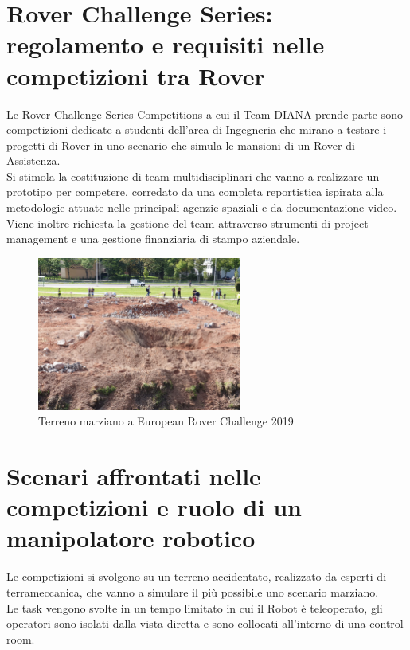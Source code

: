 \documentclass[%
corpo=11pt,
twoside,
 stile=classica,
oldstyle,
greek,%
]{toptesi}
\begin{document}
	\section{Rover Challenge Series: regolamento e requisiti nelle competizioni tra Rover}
	Le Rover Challenge Series Competitions a cui il Team DIANA prende parte sono competizioni dedicate a studenti dell'area di Ingegneria che mirano a testare i progetti di Rover in uno scenario che simula le mansioni di un Rover di Assistenza.\\
	Si stimola la costituzione di team multidisciplinari che vanno a realizzare un prototipo per competere, corredato da una completa reportistica ispirata alla metodologie attuate nelle principali agenzie spaziali e da documentazione video.\\
	 Viene inoltre richiesta la gestione del team attraverso strumenti di project management e una gestione finanziaria di stampo aziendale.
 
	\begin{figure}
		\centering
		\includegraphics[width=0.6\textwidth]{image/terrain.jpeg}
		\caption{Terreno marziano a European Rover Challenge 2019}
		\label{fig:ercterrain}
	\end{figure}

	\section{Scenari affrontati nelle competizioni e ruolo di un manipolatore robotico}
		Le competizioni si svolgono su un terreno accidentato, realizzato da esperti di terrameccanica, che vanno a simulare il più possibile uno scenario marziano. \\
		Le task vengono svolte in un tempo limitato in cui il Robot è teleoperato, gli operatori sono isolati dalla vista diretta e sono collocati all'interno di una control room. \\
		
\end{document}
